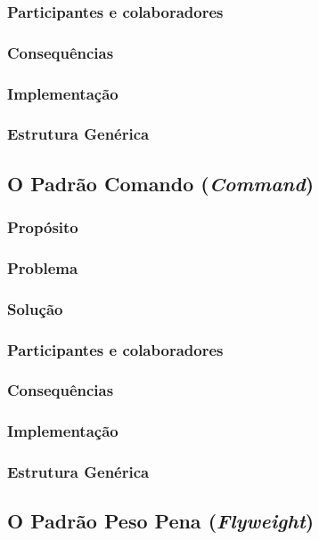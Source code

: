 \documentclass[
	11pt,				%
	openright,
	twoside,			%
	a4paper,			%
	english,			%
	french,
	brazil,				%
	sumario=tradicional
	]{abntex2}
\begin{document}
\subsubsection{Participantes e colaboradores}
\subsubsection{Consequências}
\subsubsection{Implementação}
\subsubsection{Estrutura Genérica}

\subsection{O Padrão Comando (\textit{Command})}
\subsubsection{Propósito}
\subsubsection{Problema}
\subsubsection{Solução}
\subsubsection{Participantes e colaboradores}
\subsubsection{Consequências}
\subsubsection{Implementação}
\subsubsection{Estrutura Genérica}

\subsection{O Padrão Peso Pena (\textit{Flyweight})}
\end{document}
